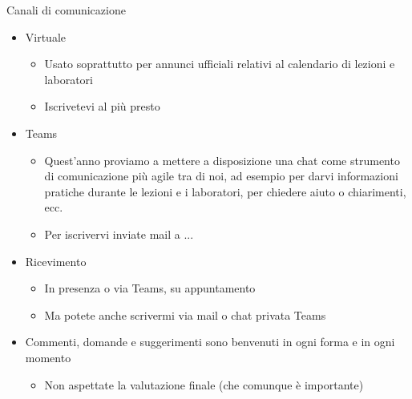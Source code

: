 \begin{frame}{Canali di comunicazione}

  \begin{itemize}[<+->]
  \item Virtuale

    \begin{itemize}[<.->]
    \item Usato soprattutto per annunci ufficiali relativi al calendario di
      lezioni e laboratori
    \item Iscrivetevi al più presto
    \end{itemize}
    
  \item Teams

    \begin{itemize}[<.->]
    \item Quest'anno proviamo a mettere a disposizione una chat come strumento
      di comunicazione più agile tra di noi, ad esempio per darvi informazioni
      pratiche durante le lezioni e i laboratori, per chiedere aiuto o
      chiarimenti, ecc.
    \item Per iscrivervi inviate mail a ...
    \end{itemize}

  \item Ricevimento

    \begin{itemize}[<.->]
    \item In presenza o via Teams, su appuntamento
    \item Ma potete anche scrivermi via mail o chat privata Teams
    \end{itemize}
    
  \item Commenti, domande e suggerimenti sono benvenuti in ogni forma e in ogni
    momento
    \begin{itemize}[<.->]
    \item Non aspettate la valutazione finale (che comunque è importante)
    \end{itemize}

  \end{itemize}
  
\end{frame}

